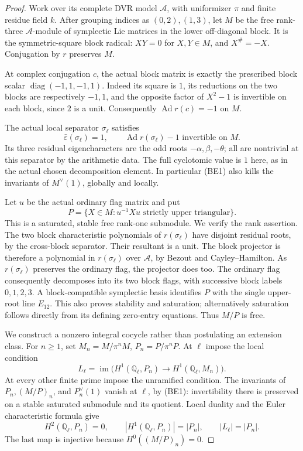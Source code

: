 \begin{proof}
Work over its complete DVR model \(\mathcal A\), with
uniformizer \(\pi\) and finite residue field \(k\).
After grouping indices as \((0,2),(1,3)\), let \(M\) be the
free rank-three \(\mathcal A\)-module of symplectic Lie
matrices in the lower off-diagonal block.
It is the symmetric-square block radical:
\(XY=0\) for \(X,Y\in M\), and \(X^\#=-X\).
Conjugation by \(r\) preserves \(M\).

At complex conjugation \(c\), the actual block matrix is
exactly the prescribed block scalar
\(\operatorname{diag}(-1,1,-1,1)\).
Indeed its square is \(1\), its reductions on the two blocks
are respectively \(-1,1\), and the opposite factor of
\(X^2-1\) is invertible on each block, since \(2\) is a unit.
Consequently \(\operatorname{Ad}r(c)=-1\) on \(M\).

The actual local separator \(\sigma_\ell\) satisfies
\[
 \bar\varepsilon(\sigma_\ell)=1,\qquad
 \operatorname{Ad}r(\sigma_\ell)-1
                         \text{ invertible on }M.         \tag{BE1}
\]
Its three residual eigencharacters are the odd roots
\(-\alpha,\beta,-\theta\); all are nontrivial at this
separator by the arithmetic data.
The full cyclotomic value is \(1\) here, as in the actual
chosen decomposition element.
In particular (BE1) also kills the invariants of
\(M^\vee(1)\), globally and locally.

Let \(u\) be the actual ordinary flag matrix and put
\[
 P=\{X\in M:u^{-1}Xu\text{ strictly upper triangular}\}.
\]
This is a saturated, stable free rank-one submodule.
We verify the rank assertion.
The two block characteristic polynomials of
\(r(\sigma_\ell)\) have disjoint residual roots, by the
cross-block separator. Their resultant is a unit.
The block projector is therefore a polynomial in
\(r(\sigma_\ell)\) over \(\mathcal A\), by Bezout and
Cayley--Hamilton. As \(r(\sigma_\ell)\) preserves the
ordinary flag, the projector does too.
The ordinary flag consequently decomposes into its two
block flags, with successive block labels \(0,1,2,3\).
A block-compatible symplectic basis identifies \(P\) with
the single upper-root line \(E_{12}\).
This also proves stability and saturation; alternatively
saturation follows directly from its defining zero-entry
equations. Thus \(M/P\) is free.

We construct a nonzero integral cocycle rather than
postulating an extension class.
For \(n\ge1\), set \(M_n=M/\pi^nM\), \(P_n=P/\pi^nP\).
At \(\ell\) impose the local condition
\[
 L_\ell=\operatorname{im}
           \bigl(H^1(\mathbb Q_\ell,P_n)
                         \longrightarrow H^1(\mathbb Q_\ell,M_n)\bigr).
\]
At every other finite prime impose the unramified condition.
The invariants of \(P_n,(M/P)_n\), and \(P_n^\vee(1)\)
vanish at \(\ell\), by (BE1): invertibility there is
preserved on a stable saturated submodule and its quotient.
Local duality and the Euler characteristic formula give
\[
 H^2(\mathbb Q_\ell,P_n)=0,\qquad
 |H^1(\mathbb Q_\ell,P_n)|=|P_n|,\qquad
                         |L_\ell|=|P_n|.                 \tag{BE2}
\]
The last map is injective because \(H^0((M/P)_n)=0\).


\end{proof}
